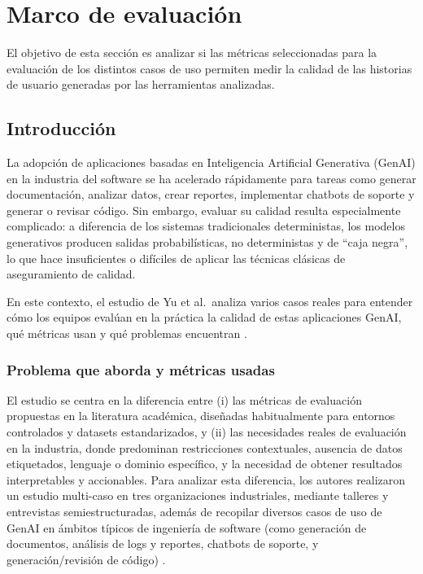 \section{Marco de evaluación}
\label{sec:marco-evaluacion-paper}

El objetivo de esta sección es analizar si las métricas seleccionadas para la evaluación de los distintos casos de uso permiten medir la calidad de las historias de usuario generadas por las herramientas analizadas.

\subsection{Introducción}
La adopción de aplicaciones basadas en Inteligencia Artificial Generativa (GenAI) en la industria del software se ha acelerado rápidamente para tareas como generar documentación, analizar datos, crear reportes, implementar chatbots de soporte y generar o revisar código. Sin embargo, evaluar su calidad resulta especialmente complicado: a diferencia de los sistemas tradicionales deterministas, los modelos generativos producen salidas probabilísticas, no deterministas y de ``caja negra'', lo que hace insuficientes o difíciles de aplicar las técnicas clásicas de aseguramiento de calidad.

En este contexto, el estudio de Yu et al.\ analiza varios casos reales para entender cómo los equipos evalúan en la práctica la calidad de estas aplicaciones GenAI, qué métricas usan y qué problemas encuentran \cite{yu2026evaluating_genai_quality_multicase}.

\subsubsection{Problema que aborda y métricas usadas}
El estudio se centra en la diferencia entre (i) las métricas de evaluación propuestas en la literatura académica, diseñadas habitualmente para entornos controlados y datasets estandarizados, y (ii) las necesidades reales de evaluación en la industria, donde predominan restricciones contextuales, ausencia de datos etiquetados, lenguaje o dominio específico, y la necesidad de obtener resultados interpretables y accionables.
Para analizar esta diferencia, los autores realizaron un estudio multi-caso en tres organizaciones industriales, mediante talleres y entrevistas semiestructuradas, además de recopilar diversos casos de uso de GenAI en ámbitos típicos de ingeniería de software (como generación de documentos, análisis de logs y reportes, chatbots de soporte, y generación/revisión de código) \cite{yu2026evaluating_genai_quality_multicase}.


